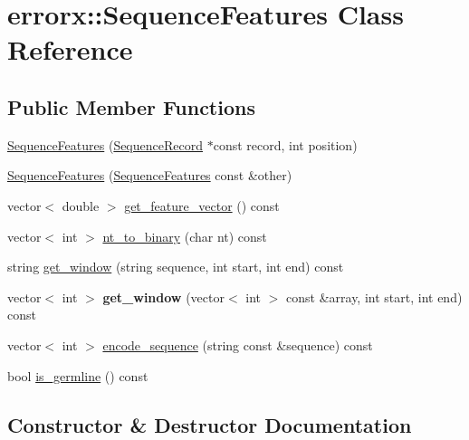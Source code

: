 \hypertarget{classerrorx_1_1_sequence_features}{}\section{errorx\+:\+:Sequence\+Features Class Reference}
\label{classerrorx_1_1_sequence_features}
\subsection*{Public Member Functions}
\begin{DoxyCompactItemize}
\item 
\mbox{\hyperlink{classerrorx_1_1_sequence_features_a5bb9d0bcb3bd6c7877a9902806adc999}{Sequence\+Features}} (\mbox{\hyperlink{classerrorx_1_1_sequence_record}{Sequence\+Record}} $\ast$const record, int position)
\item 
\mbox{\hyperlink{classerrorx_1_1_sequence_features_a56d12eebfb084dc6cb0ce45faf3148ef}{Sequence\+Features}} (\mbox{\hyperlink{classerrorx_1_1_sequence_features}{Sequence\+Features}} const \&other)
\item 
vector$<$ double $>$ \mbox{\hyperlink{classerrorx_1_1_sequence_features_acef9190004088f796ed80cfd32528c47}{get\+\_\+feature\+\_\+vector}} () const
\item 
vector$<$ int $>$ \mbox{\hyperlink{classerrorx_1_1_sequence_features_a3af95ae62f69328d2fec423328130709}{nt\+\_\+to\+\_\+binary}} (char nt) const
\item 
string \mbox{\hyperlink{classerrorx_1_1_sequence_features_a1745dab8123b3da0a8412540ece75b0e}{get\+\_\+window}} (string sequence, int start, int end) const
\item 
\mbox{\label{classerrorx_1_1_sequence_features_aef8b453429cc7a18ae9006db84a94d07}} 
vector$<$ int $>$ {\bfseries get\+\_\+window} (vector$<$ int $>$ const \&array, int start, int end) const
\item 
vector$<$ int $>$ \mbox{\hyperlink{classerrorx_1_1_sequence_features_aecea6d891f4f91631b8d696882d0af7a}{encode\+\_\+sequence}} (string const \&sequence) const
\item 
bool \mbox{\hyperlink{classerrorx_1_1_sequence_features_a154c6386de18b0200446e4f2e6935296}{is\+\_\+germline}} () const
\end{DoxyCompactItemize}


\subsection{Constructor \& Destructor Documentation}
\mbox{\label{classerrorx_1_1_sequence_features_a5bb9d0bcb3bd6c7877a9902806adc999}} 
